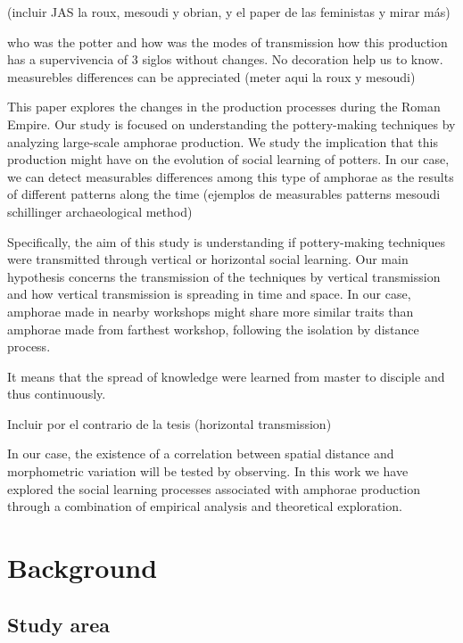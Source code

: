 \documentclass[review]{elsarticle}
\begin{document}
 (incluir JAS la roux, mesoudi y obrian, y el paper de las feministas y mirar más) 



who was the potter and how was the modes of  transmission how this production has a supervivencia of 3 siglos without changes. No decoration help us to know. measurebles differences can be appreciated (meter aqui la roux y mesoudi)


This paper explores the changes in the production processes during the Roman Empire. Our study is focused on understanding the pottery-making techniques by analyzing large-scale amphorae production. We study the implication that this production might have on the evolution of social learning of potters. In our case, we can detect measurables differences among this type of amphorae as the results of different patterns along the time (ejemplos de measurables patterns mesoudi schillinger archaeological method)

Specifically, the aim of this study is understanding if pottery-making techniques were transmitted through vertical or horizontal social learning. Our main hypothesis concerns the transmission of the techniques by vertical transmission and how vertical transmission is spreading in time and space. In our case, amphorae made in nearby workshops might share more similar traits than amphorae made from farthest workshop, following the isolation by distance process. 




It  means that the spread of knowledge were learned from master to disciple and thus continuously. 


Incluir por el contrario de la tesis (horizontal transmission)


In our case, the existence of a correlation between spatial distance and morphometric variation will be tested by observing. In this work we have explored the social learning processes associated with amphorae production through a combination of empirical analysis and theoretical exploration.





\section{Background}

\subsection{Study area}
\end{document}
